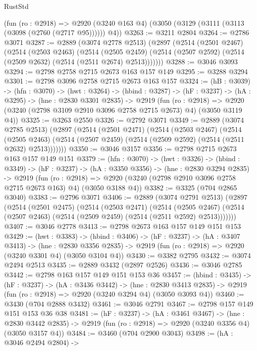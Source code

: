 \begin{lexlean}{RustStd}
\begin{coremodule}
    (fun (ro : @2918) =>
    @2920 (@3240 @163 @4) (@3050 (@3129 (@3111 (@3113 (@3098 (@2760 (@2717 @95)))))) @4))
@3263 := @3211 @2804
@3264 := @2786 @3071
@3287 := @2889
    (@3074 @2778 @2513)
    (@2897
      (@2514
        (@2501 @2467)
        (@2514
          (@2503 @2463)
          (@2514
            (@2505 @2459)
            (@2514 (@2507 @2592) (@2514 (@2509 @2632) (@2514 (@2511 @2674) @2513)))))))
@3288 := @3046 @3093
@3294 := @2798 @2758 @2715 @2673 @163 @157 @149
@3295 := @3288 @3294
@3301 := @2798 @3096 @2758 @2715 @2673 @163 @157
@3324 := (hB : @3039) ->
  (hfn : @3070) ->
  (hwt : @3264) ->
  (hbind : @3287) ->
  (hF : @3237) ->
  (hA : @3295) ->
  (hne : @2830 @3301 @2835) ->
  @2919
    (fun (ro : @2918) =>
    @2920 (@3240 (@2798 @3109 @2910 @3096 @2758 @2715 @2673) @4) (@3050 @3119 @4))
@3325 := @3263 @2550
@3326 := @2792 @3071
@3349 := @2889
    (@3074 @2785 @2513)
    (@2897
      (@2514
        (@2501 @2471)
        (@2514
          (@2503 @2467)
          (@2514
            (@2505 @2463)
            (@2514 (@2507 @2459) (@2514 (@2509 @2592) (@2514 (@2511 @2632) @2513)))))))
@3350 := @3046 @3157
@3356 := @2798 @2715 @2673 @163 @157 @149 @151
@3379 := (hfn : @3070) ->
  (hwt : @3326) ->
  (hbind : @3349) ->
  (hF : @3237) ->
  (hA : @3350 @3356) ->
  (hne : @2830 @3294 @2835) ->
  @2919
    (fun (ro : @2918) =>
    @2920 (@3240 (@2798 @2910 @3096 @2758 @2715 @2673 @163) @4) (@3050 @3188 @4))
@3382 := @3325 (@704 @2865 @3040)
@3383 := @2796 @3071
@3406 := @2889
    (@3074 @2791 @2513)
    (@2897
      (@2514
        (@2501 @2475)
        (@2514
          (@2503 @2471)
          (@2514
            (@2505 @2467)
            (@2514 (@2507 @2463) (@2514 (@2509 @2459) (@2514 (@2511 @2592) @2513)))))))
@3407 := @3046 @2778
@3413 := @2798 @2673 @163 @157 @149 @151 @153
@3429 := (hwt : @3383) ->
  (hbind : @3406) ->
  (hF : @3237) ->
  (hA : @3407 @3413) ->
  (hne : @2830 @3356 @2835) -> @2919 (fun (ro : @2918) => @2920 (@3240 @3301 @4) (@3050 @3104 @4))
@3430 := @3382 @2795
@3432 := @3074 @2494 @2513
@3435 := @2889 @3432 (@2897 @2526)
@3436 := @3046 @2785
@3442 := @2798 @163 @157 @149 @151 @153 @36
@3457 := (hbind : @3435) ->
  (hF : @3237) ->
  (hA : @3436 @3442) ->
  (hne : @2830 @3413 @2835) -> @2919 (fun (ro : @2918) => @2920 (@3240 @3294 @4) (@3050 @3093 @4))
@3460 := @3430 (@704 @2888 @3432)
@3461 := @3046 @2791
@3467 := @2798 @157 @149 @151 @153 @36 @38
@3481 := (hF : @3237) ->
  (hA : @3461 @3467) ->
  (hne : @2830 @3442 @2835) -> @2919 (fun (ro : @2918) => @2920 (@3240 @3356 @4) (@3050 @3157 @4))
@3484 := @3460 (@704 @2900 @3043)
@3498 := (hA : @3046 @2494 @2804) ->

\end{coremodule}
\end{lexlean}
